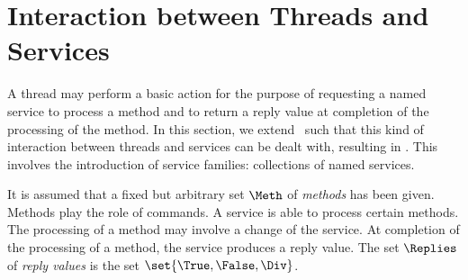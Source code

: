 \documentclass[fleqn]{llncs}
\begin{document}
\section{Interaction between Threads and Services}
\label{sect-TAbt}

A thread may perform a basic action for the purpose of requesting a
named service to process a method and to return a reply value at
completion of the processing of the method.
In this section, we extend \BTAbt\ such that this kind of interaction
between threads and services can be dealt with, resulting in \TAbt.
This involves the introduction of service families: collections of named
services.

It is assumed that a fixed but arbitrary set $\Meth$ of \emph{methods}
has been given.
Methods play the role of commands.
A service is able to process certain methods.
The processing of a method may involve a change of the service.
At completion of the processing of a method, the service produces a
reply value.
The set $\Replies$ of \emph{reply values} is the set
$\set{\True,\False,\Div}$.
\end{document}
